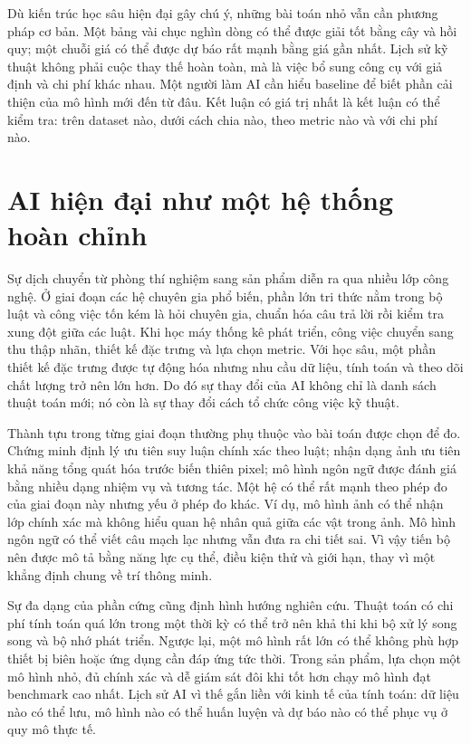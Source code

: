 \documentclass[12pt,a4paper]{report}
\begin{document}
Dù kiến trúc học sâu hiện đại gây chú ý, những bài toán nhỏ vẫn cần phương pháp cơ bản. Một bảng vài chục nghìn dòng có thể được giải tốt bằng cây và hồi quy; một chuỗi giá có thể được dự báo rất mạnh bằng giá gần nhất. Lịch sử kỹ thuật không phải cuộc thay thế hoàn toàn, mà là việc bổ sung công cụ với giả định và chi phí khác nhau. Một người làm AI cần hiểu baseline để biết phần cải thiện của mô hình mới đến từ đâu. Kết luận có giá trị nhất là kết luận có thể kiểm tra: trên dataset nào, dưới cách chia nào, theo metric nào và với chi phí nào.

\section{AI hiện đại như một hệ thống hoàn chỉnh}
Sự dịch chuyển từ phòng thí nghiệm sang sản phẩm diễn ra qua nhiều lớp công nghệ. Ở giai đoạn các hệ chuyên gia phổ biến, phần lớn tri thức nằm trong bộ luật và công việc tốn kém là hỏi chuyên gia, chuẩn hóa câu trả lời rồi kiểm tra xung đột giữa các luật. Khi học máy thống kê phát triển, công việc chuyển sang thu thập nhãn, thiết kế đặc trưng và lựa chọn metric. Với học sâu, một phần thiết kế đặc trưng được tự động hóa nhưng nhu cầu dữ liệu, tính toán và theo dõi chất lượng trở nên lớn hơn. Do đó sự thay đổi của AI không chỉ là danh sách thuật toán mới; nó còn là sự thay đổi cách tổ chức công việc kỹ thuật.

Thành tựu trong từng giai đoạn thường phụ thuộc vào bài toán được chọn để đo. Chứng minh định lý ưu tiên suy luận chính xác theo luật; nhận dạng ảnh ưu tiên khả năng tổng quát hóa trước biến thiên pixel; mô hình ngôn ngữ được đánh giá bằng nhiều dạng nhiệm vụ và tương tác. Một hệ có thể rất mạnh theo phép đo của giai đoạn này nhưng yếu ở phép đo khác. Ví dụ, mô hình ảnh có thể nhận lớp chính xác mà không hiểu quan hệ nhân quả giữa các vật trong ảnh. Mô hình ngôn ngữ có thể viết câu mạch lạc nhưng vẫn đưa ra chi tiết sai. Vì vậy tiến bộ nên được mô tả bằng năng lực cụ thể, điều kiện thử và giới hạn, thay vì một khẳng định chung về trí thông minh.

Sự đa dạng của phần cứng cũng định hình hướng nghiên cứu. Thuật toán có chi phí tính toán quá lớn trong một thời kỳ có thể trở nên khả thi khi bộ xử lý song song và bộ nhớ phát triển. Ngược lại, một mô hình rất lớn có thể không phù hợp thiết bị biên hoặc ứng dụng cần đáp ứng tức thời. Trong sản phẩm, lựa chọn một mô hình nhỏ, đủ chính xác và dễ giám sát đôi khi tốt hơn chạy mô hình đạt benchmark cao nhất. Lịch sử AI vì thế gắn liền với kinh tế của tính toán: dữ liệu nào có thể lưu, mô hình nào có thể huấn luyện và dự báo nào có thể phục vụ ở quy mô thực tế.
\end{document}
